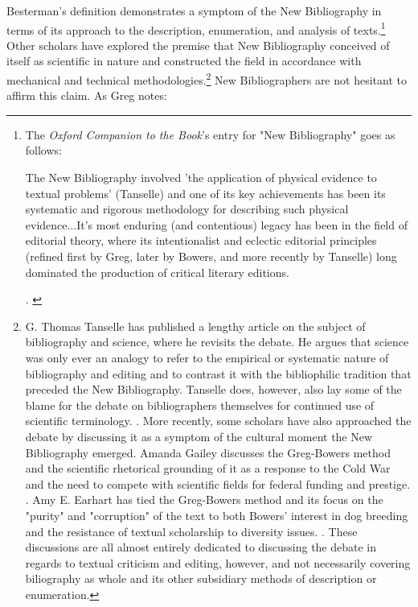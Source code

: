 Besterman's definition demonstrates a symptom of the New Bibliography in terms of its approach to the description, enumeration, and analysis of texts.\footnote{The \textit{Oxford Companion to the Book}'s entry for "New Bibliography" goes as follows:\begin{displayquote}
The New Bibliography involved 'the application of physical evidence to textual problems' (Tanselle) and one of its key achievements has been its systematic and rigorous methodology for describing such physical evidence...It's most enduring (and contentious) legacy has been in the field of editorial theory, where its intentionalist and eclectic editorial principles (refined first by Greg, later by Bowers, and more recently by Tanselle) long dominated the production of critical literary editions.
\end{displayquote}\autocite[963]{suarez_oxford_2010}. \autocite[40]{tanselle_bibliographical_1988}} Other scholars have explored the premise that New Bibliography conceived of itself as scientific in nature and constructed the field in accordance with mechanical and technical methodologies.\footnote{G. Thomas Tanselle has published a lengthy article on the subject of bibliography and science, where he revisits the debate. He argues that science was only ever an analogy to refer to the empirical or systematic nature of bibliography and editing and to contrast it with the bibliophilic tradition that preceded the New Bibliography. Tanselle does, however, also lay some of the blame for the debate on bibliographers themselves for continued use of scientific terminology. \autocite[57]{tanselle_bibliography_1974}. More recently, some scholars have also approached the debate by discussing it as a symptom of the cultural moment the New Bibliography emerged. Amanda Gailey discusses the Greg-Bowers method and the scientific rhetorical grounding of it as a response to the Cold War and the need to compete with scientific fields for federal funding and prestige. \autocite{gailey_proofs_2015}. Amy E. Earhart has tied the Greg-Bowers method and its focus on the "purity" and "corruption" of the text to both Bowers' interest in dog breeding and the resistance of textual scholarship to diversity issues. \autocite[36-7]{earhart_traces_2015}. These discussions are all almost entirely dedicated to discussing the debate in regards to textual criticism and editing, however, and not necessarily covering biliography as whole and its other subsidiary methods of description or enumeration.} New Bibliographers are not hesitant to affirm this claim. As Greg notes: 

